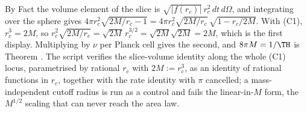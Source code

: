 By Fact  the volume element of the slice is $\sqrt{|f(r_c)|}\,r_c^{2}\,dt\,d\Omega$, and integrating over the sphere gives $4\pi r_c^{2}\sqrt{2M/r_c - 1} = 4\pi r_c^{2}\sqrt{2M/r_c}\,\sqrt{1 - r_c/2M}$. With (C1), $r_c^{3} = 2M$, so $r_c^{2}\sqrt{2M/r_c} = \sqrt{2M}\,r_c^{3/2} = \sqrt{2M}\sqrt{2M} = 2M$, which is the first display. Multiplying by $\nu$ per Planck cell gives the second, and $8\pi M = 1/\TH$ is Theorem . The script verifies the slice-volume identity along the whole (C1) locus, parametrised by rational $r_c$ with $2M := r_c^{3}$, as an identity of rational functions in $r_c$, together with the rate identity with $\pi$ cancelled; a mass-independent cutoff radius is run as a control and fails the linear-in-$M$ form, the $M^{1/2}$ scaling that can never reach the area law.
